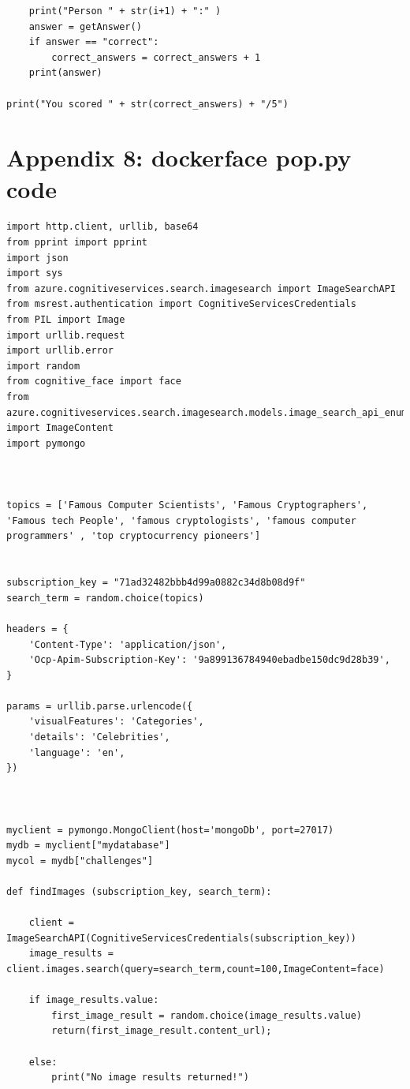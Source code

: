 \documentclass[12pt,a4paper]{article}
\begin{document}
\begin{appendices}
\begin{lstlisting}
    print("Person " + str(i+1) + ":" )
    answer = getAnswer() 
    if answer == "correct": 
        correct_answers = correct_answers + 1  
    print(answer)  
        
print("You scored " + str(correct_answers) + "/5")
\end{lstlisting}
\section{Appendix 8: docker\textunderscore face \textunderscore pop.py code}  
\begin{lstlisting}
import http.client, urllib, base64
from pprint import pprint 
import json
import sys 
from azure.cognitiveservices.search.imagesearch import ImageSearchAPI
from msrest.authentication import CognitiveServicesCredentials  
from PIL import Image 
import urllib.request  
import urllib.error  
import random
from cognitive_face import face
from azure.cognitiveservices.search.imagesearch.models.image_search_api_enums import ImageContent
import pymongo 



topics = ['Famous Computer Scientists', 'Famous Cryptographers', 'Famous tech People', 'famous cryptologists', 'famous computer programmers' , 'top cryptocurrency pioneers']


subscription_key = "71ad32482bbb4d99a0882c34d8b08d9f"
search_term = random.choice(topics)   

headers = {
    'Content-Type': 'application/json',
    'Ocp-Apim-Subscription-Key': '9a899136784940ebadbe150dc9d28b39',
}

params = urllib.parse.urlencode({
    'visualFeatures': 'Categories',
    'details': 'Celebrities',
    'language': 'en',
}) 



myclient = pymongo.MongoClient(host='mongoDb', port=27017)  
mydb = myclient["mydatabase"]
mycol = mydb["challenges"]

def findImages (subscription_key, search_term):

    client = ImageSearchAPI(CognitiveServicesCredentials(subscription_key)) 
    image_results = client.images.search(query=search_term,count=100,ImageContent=face) 

    if image_results.value:
        first_image_result = random.choice(image_results.value)  
        return(first_image_result.content_url); 

    else:
        print("No image results returned!") 
    

\end{lstlisting}
\end{appendices}
\end{document}
